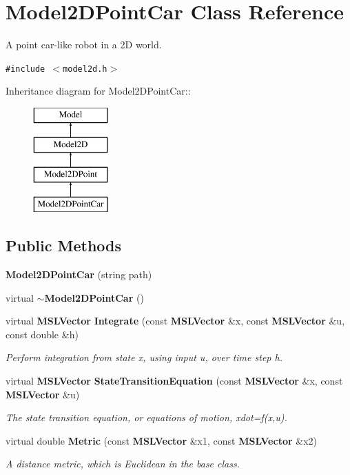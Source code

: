 \section{Model2DPoint\-Car  Class Reference}
\label{class_Model2DPointCar}
A point car-like robot in a 2D world. 


{\tt \#include $<$model2d.h$>$}

Inheritance diagram for Model2DPoint\-Car::\begin{figure}[H]
\begin{center}
\leavevmode
\includegraphics[height=4cm]{class_Model2DPointCar}
\end{center}
\end{figure}
\subsection*{Public Methods}
\begin{CompactItemize}
\item 
{\bf Model2DPoint\-Car} (string path)
\item 
virtual {\bf $\sim$Model2DPoint\-Car} ()
\item 
virtual {\bf MSLVector} {\bf Integrate} (const {\bf MSLVector} \&x, const {\bf MSLVector} \&u, const double \&h)
\begin{CompactList}\small\item\em Perform integration from state x, using input u, over time step h.\item\end{CompactList}\item 
virtual {\bf MSLVector} {\bf State\-Transition\-Equation} (const {\bf MSLVector} \&x, const {\bf MSLVector} \&u)
\begin{CompactList}\small\item\em The state transition equation, or equations of motion, xdot=f(x,u).\item\end{CompactList}\item 
virtual double {\bf Metric} (const {\bf MSLVector} \&x1, const {\bf MSLVector} \&x2)
\begin{CompactList}\small\item\em A distance metric, which is Euclidean in the base class.\item\end{CompactList}\end{CompactItemize}
